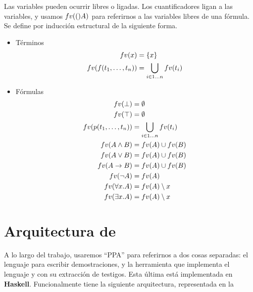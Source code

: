 \begin{definition}
    Las variables pueden ocurrir libres o ligadas. Los cuantificadores ligan a
    las variables, y usamos $fv(()A)$ para referirnos a las variables libres
    de una fórmula. Se define por inducción estructural de la siguiente forma.

    \begin{itemize}
        \item Términos
        \begin{align*}
            fv(x) &= \{ x \}\\
            fv(f(t_1, \dots, t_n)) &= \bigcup_{i \in 1\dots n} fv(t_i) 
        \end{align*}
    
        \item Fórmulas
        \begin{align*}
            fv(\bot) &=\emptyset\\
            fv(\top) &=\emptyset \\
            fv(p(t_1, \dots, t_n)) &= \bigcup_{i \in 1\dots n} fv(t_i) \\
            fv(A \wedge B) &= fv(A) \cup fv(B)\\
            fv(A \vee B) &=fv(A) \cup fv(B)\\
            fv(A \to B) &=fv(A) \cup fv(B)\\
            fv(\neg A) &=fv(A)\\
            fv(\forall x . A) &= fv(A) \setminus x \\
            fv(\exists x . A) &= fv(A) \setminus x
        \end{align*}
    \end{itemize}
\end{definition}


\section{Arquitectura de \ppaTool{}}

A lo largo del trabajo, usaremos ``PPA'' para referirnos a dos cosas separadas: \ppaLang{} el lenguaje para escribir demostraciones, y \ppaTool{} la herramienta que implementa el lenguaje y con su extracción de testigos. Esta última está implementada en \textbf{Haskell}. Funcionalmente tiene la siguiente arquitectura, representada en la 

